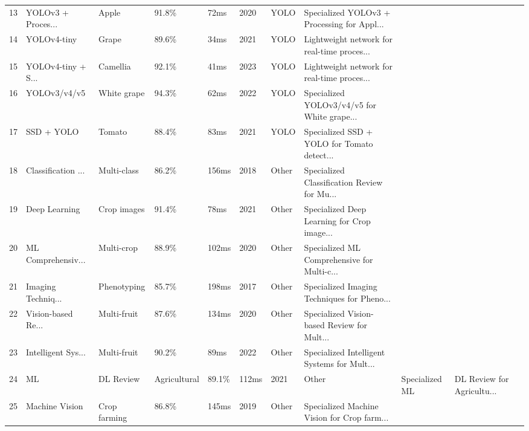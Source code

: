 \begin{table*}[htbp]
\begin{tabular}{p{}p{}p{}p{}p{}p{}p{}p{}p{}}
13 & YOLOv3 + Proces... & Apple & 91.8\% & 72ms & 2020 & YOLO & Specialized YOLOv3 + Processing for Appl... & \cite{kuznetsova2020using} \\
14 & YOLOv4-tiny & Grape & 89.6\% & 34ms & 2021 & YOLO & Lightweight network for real-time proces... & \cite{li2021real} \\
15 & YOLOv4-tiny + S... & Camellia & 92.1\% & 41ms & 2023 & YOLO & Lightweight network for real-time proces... & \cite{tang2023fruit} \\
16 & YOLOv3/v4/v5 & White grape & 94.3\% & 62ms & 2022 & YOLO & Specialized YOLOv3/v4/v5 for White grape... & \cite{sozzi2022automatic} \\
17 & SSD + YOLO & Tomato & 88.4\% & 83ms & 2021 & YOLO & Specialized SSD + YOLO for Tomato detect... & \cite{magalhaes2021evaluating} \\
18 & Classification ... & Multi-class & 86.2\% & 156ms & 2018 & Other & Specialized Classification Review for Mu... & \cite{hameed2018comprehensive} \\
19 & Deep Learning & Crop images & 91.4\% & 78ms & 2021 & Other & Specialized Deep Learning for Crop image... & \cite{darwin2021recognition} \\
20 & ML Comprehensiv... & Multi-crop & 88.9\% & 102ms & 2020 & Other & Specialized ML Comprehensive for Multi-c... & \cite{sharma2020machine} \\
21 & Imaging Techniq... & Phenotyping & 85.7\% & 198ms & 2017 & Other & Specialized Imaging Techniques for Pheno... & \cite{narvaez2017survey} \\
22 & Vision-based Re... & Multi-fruit & 87.6\% & 134ms & 2020 & Other & Specialized Vision-based Review for Mult... & \cite{tang2020recognition} \\
23 & Intelligent Sys... & Multi-fruit & 90.2\% & 89ms & 2022 & Other & Specialized Intelligent Systems for Mult... & \cite{zhou2022intelligent} \\
24 & ML & DL Review & Agricultural & 89.1\% & 112ms & 2021 & Other & Specialized ML & DL Review for Agricultu... & \cite{saleem2021automation} \\
25 & Machine Vision & Crop farming & 86.8\% & 145ms & 2019 & Other & Specialized Machine Vision for Crop farm... & \cite{mavridou2019machine} \\
\bottomrule
\end{tabular}
\end{table*}

